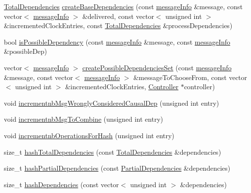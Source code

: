 \begin{DoxyCompactItemize}
\item 
\hyperlink{class_total_dependencies}{Total\+Dependencies} \hyperlink{class_hash_error_detector_a09b0d73b3a717ddf850fe644848c15c6}{create\+Base\+Dependencies} (const \hyperlink{structures_8h_a7e7bdc1d2fff8a9436f2f352b2711ed6}{message\+Info} \&message, const vector$<$ \hyperlink{structures_8h_a7e7bdc1d2fff8a9436f2f352b2711ed6}{message\+Info} $>$ \&delivered, const vector$<$ unsigned int $>$ \&incremented\+Clock\+Entries, const \hyperlink{class_total_dependencies}{Total\+Dependencies} \&process\+Dependencies)
\item 
bool \hyperlink{class_hash_error_detector_aaaceeb3d2d27d5f3c85a9b80f959e0fe}{is\+Possible\+Dependency} (const \hyperlink{structures_8h_a7e7bdc1d2fff8a9436f2f352b2711ed6}{message\+Info} \&message, const \hyperlink{structures_8h_a7e7bdc1d2fff8a9436f2f352b2711ed6}{message\+Info} \&possible\+Dep)
\item 
vector$<$ \hyperlink{structures_8h_a7e7bdc1d2fff8a9436f2f352b2711ed6}{message\+Info} $>$ \hyperlink{class_hash_error_detector_ae8605d778886baa20648a9f5955c5943}{create\+Possible\+Dependencies\+Set} (const \hyperlink{structures_8h_a7e7bdc1d2fff8a9436f2f352b2711ed6}{message\+Info} \&message, const vector$<$ \hyperlink{structures_8h_a7e7bdc1d2fff8a9436f2f352b2711ed6}{message\+Info} $>$ \&message\+To\+Choose\+From, const vector$<$ unsigned int $>$ \&incremented\+Clock\+Entries, \hyperlink{class_controller}{Controller} $\ast$controller)
\item 
void \hyperlink{class_hash_error_detector_a007d537bdfd329c6b23b432b58d4cf4c}{incrementnb\+Msg\+Wrongly\+Considered\+Causal\+Dep} (unsigned int entry)
\item 
void \hyperlink{class_hash_error_detector_a08b4518822a6beff6845da4dd36bfba1}{incrementnb\+Msg\+To\+Combine} (unsigned int entry)
\item 
void \hyperlink{class_hash_error_detector_a6aa56dfbb555e15093bd5d93a683fa42}{incrementnb\+Operations\+For\+Hash} (unsigned int entry)
\item 
size\+\_\+t \hyperlink{class_hash_error_detector_afcad668b4f0ca1c838b40a3c0584c1ee}{hash\+Total\+Dependencies} (const \hyperlink{class_total_dependencies}{Total\+Dependencies} \&dependencies)
\item 
size\+\_\+t \hyperlink{class_hash_error_detector_aed8b0c6d17198a493e5b89f69c2e8713}{hash\+Partial\+Dependencies} (const \hyperlink{class_partial_dependencies}{Partial\+Dependencies} \&dependencies)
\item 
size\+\_\+t \hyperlink{class_hash_error_detector_a37d0ee7d8a01b530a03262e4483c53d9}{hash\+Dependencies} (const vector$<$ unsigned int $>$ \&dependencies)

\end{DoxyCompactItemize}
